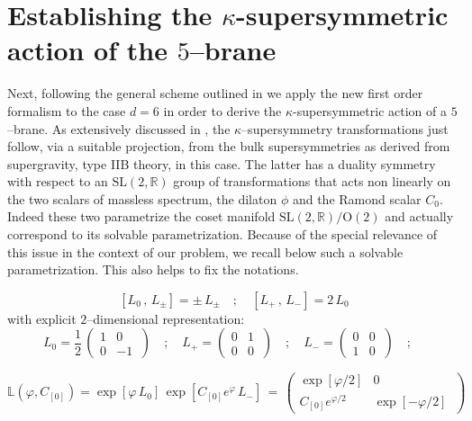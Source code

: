 \documentclass[a4paper,11pt]{article}
\newcommand{\ft}[2]{{\textstyle\frac{#1}{#2}}}
\begin{document}
\section{Establishing the $\kappa$-supersymmetric action of the $5$--brane}
\label{thed3examp}
Next, following the general scheme outlined in \cite{noidued3} we apply
the new first order formalism  to the case $d=6$ in order to derive the $\kappa$-supersymmetric
action of a $5$--brane. As extensively discussed in \cite{noidued3},
the $\kappa$--supersymmetry transformations just follow, via a suitable projection, from
the bulk supersymmetries as derived from supergravity, type IIB
theory, in this case. The latter has a duality symmetry with respect
to an $\mathrm{SL(2,\mathbb{R})}$ group of transformations that acts
non linearly on the two scalars of massless spectrum, the dilaton $\phi$ and
the Ramond scalar $C_0$. Indeed these two parametrize the coset
manifold $\mathrm{SL(2,\mathbb{R})}/\mathrm{O(2)}$ and actually
correspond to its solvable parametrization. Because of the special
relevance of this issue in the context of our problem, we recall below
such a solvable parametrization. This also helps to fix the notations.
\par
{}
\begin{equation}
  \left[ L_0 \, , \, L_\pm \right] = \pm \, L_\pm \quad ; \quad \left[ L_+ \, , \, L_- \right] = 2 \,
  L_0
\label{sl2alg}
\end{equation}
with explicit $2$--dimensional representation:
\begin{equation}
  L_0= \ft 1 2 \, \left( \begin{array}{cc}
    1 & 0 \\
    0 & -1 \
  \end{array}\right) \quad ; \quad L_+= \left( \begin{array}{cc}
    0 & 1 \\
    0 & 0 \
  \end{array}\right) \quad ; \quad L_-= \left( \begin{array}{cc}
    0 & 0 \\
    1 & 0 \
  \end{array}\right) \quad ; \quad
\label{2drepsl2r}
\end{equation}
\par
{}
\begin{equation}
  \mathbb{L}\left( \varphi , C_{[0]} \right) =\exp \left[  \varphi \, L_0 \right]  \, \exp \left[
  C_{[0]} e^{\varphi} \, L_-\right] \, = \, \left( \begin{array}{cc}
    \exp[\varphi/2] & 0 \\
    C_{[0]}e^{\varphi/2} & \exp[-\varphi/2] \
  \end{array}\right)
\label{Lfatcoset}
\end{equation}
\end{document}
